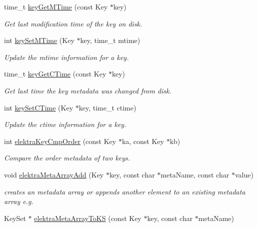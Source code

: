 \begin{DoxyCompactItemize}
time\+\_\+t \mbox{\hyperlink{group__meta_ga57689eb5691679071463b777ae786ae9}{key\+Get\+M\+Time}} (const Key $\ast$key)
\begin{DoxyCompactList}\small\item\em Get last modification time of the key on disk. \end{DoxyCompactList}\item 
int \mbox{\hyperlink{group__meta_ga481d8997187992fe4bbf288bc8ef4db7}{key\+Set\+M\+Time}} (Key $\ast$key, time\+\_\+t mtime)
\begin{DoxyCompactList}\small\item\em Update the mtime information for a key. \end{DoxyCompactList}\item 
time\+\_\+t \mbox{\hyperlink{group__meta_ga2c213c120cbe02201278ef7fb8cd94be}{key\+Get\+C\+Time}} (const Key $\ast$key)
\begin{DoxyCompactList}\small\item\em Get last time the key metadata was changed from disk. \end{DoxyCompactList}\item 
int \mbox{\hyperlink{group__meta_ga9f502ecab8ab43f0b17220fcc95f3fa5}{key\+Set\+C\+Time}} (Key $\ast$key, time\+\_\+t ctime)
\begin{DoxyCompactList}\small\item\em Update the ctime information for a key. \end{DoxyCompactList}\item 
int \mbox{\hyperlink{group__meta_gab8b30dfabb0867bd6899e60e7bd193a2}{elektra\+Key\+Cmp\+Order}} (const Key $\ast$ka, const Key $\ast$kb)
\begin{DoxyCompactList}\small\item\em Compare the order metadata of two keys. \end{DoxyCompactList}\item 
void \mbox{\hyperlink{group__meta_ga166c65c4eb2d758ced57b0bd74fb9a57}{elektra\+Meta\+Array\+Add}} (Key $\ast$key, const char $\ast$meta\+Name, const char $\ast$value)
\begin{DoxyCompactList}\small\item\em creates an metadata array or appends another element to an existing metadata array e.\+g. \end{DoxyCompactList}\item 
Key\+Set $\ast$ \mbox{\hyperlink{group__meta_ga57e189e739d942d60bb83765ced5cef2}{elektra\+Meta\+Array\+To\+KS}} (const Key $\ast$key, const char $\ast$meta\+Name)

\end{DoxyCompactItemize}
